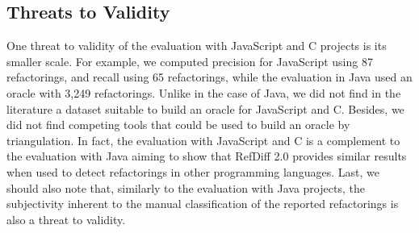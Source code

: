 \subsection{Threats to Validity}
\label{SecThreatsJsC}

One threat to validity of the evaluation with JavaScript and C projects is its smaller scale.
For example, we computed precision for JavaScript using 87 refactorings, and  recall using 65 refactorings, while the evaluation in Java used an oracle with 3,249 refactorings.
Unlike in the case of Java, we did not find in the literature a dataset suitable to build an oracle for JavaScript and C.
Besides, we did not find competing tools that could be used to build an oracle by triangulation.
In fact, the evaluation with JavaScript and C is a complement to the evaluation with Java aiming to show that RefDiff 2.0 provides similar results when used to detect refactorings in other programming languages.
Last, we should also note that, similarly to the evaluation with Java projects, the subjectivity inherent to the manual classification of the reported refactorings is also a threat to validity.
